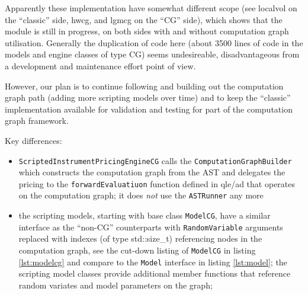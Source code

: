 \documentclass[12pt, a4paper]{report}
\begin{document}
Apparently these implementation have somewhat different scope (see localvol on the ``classic'' side,
hwcg, and lgmcg on the ``CG'' side), which shows that the module is
still in progress, on both sides with and without computation graph utilisation.
Generally the duplication of code here (about 3500 lines of code in the models and engine
classes of type CG) seems undesireable, disadvantageous from a development and maintenance effort
point of view.

However, our plan is to continue following and building out the computation graph
path (adding more scripting models over time) and to keep the ``classic'' implementation available
for validation and testing for part of the computation graph framework.

Key differences:
\begin{itemize}
\item {\tt ScriptedInstrumentPricingEngineCG} calls the {\tt ComputationGraphBuilder} which
  constructs the computation graph from the AST and delegates the pricing to the
  {\tt forwardEvaluatiuon} function defined in qle/ad that operates on the computation graph;
  it does {\em not} use the {\tt ASTRunner} any more
\item the scripting models, starting with base class {\tt ModelCG}, have a similar interface as
  the ``non-CG'' counterparts with {\tt RandomVariable} arguments replaced with indexes (of type
  std::size\_t) referencing nodes in the computation graph, see the cut-down listing of
  {\tt ModelCG} in listing \ref{lst:modelcg} and compare to the {\tt Model} interface in
  listing  \ref{lst:model}; the scripting model classes provide additional
  member functions that reference random variates and model parameters on the graph;
\end{itemize}
\end{document}
